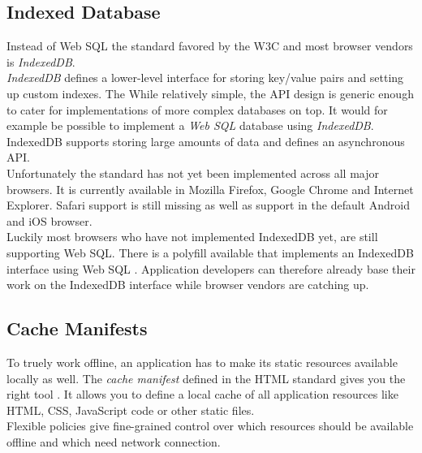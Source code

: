 \subsection{Indexed Database}
Instead of Web SQL the standard favored by the W3C and most browser vendors is \emph{IndexedDB}.\\
\emph{IndexedDB} defines a lower-level interface for storing key/value pairs and setting up custom indexes.
The While relatively simple, the API design is generic enough to cater for implementations of more complex databases on top.
It would for example be possible to implement a \emph{Web SQL} database using \emph{IndexedDB}.\\
IndexedDB supports storing large amounts of data and defines an asynchronous API.\\
Unfortunately the standard has not yet been implemented across all major browsers.
It is currently available in Mozilla Firefox, Google Chrome and Internet Explorer.
Safari support is still missing as well as support in the default Android and iOS browser.\\
Luckily most browsers who have not implemented IndexedDB yet, are still supporting Web SQL.
There is a polyfill available that implements an IndexedDB interface using Web SQL \cite{indexeddb_polyfill}. Application developers can therefore already base their work on the IndexedDB interface while browser vendors are catching up.

\subsection{Cache Manifests}
To truely work offline, an application has to make its static resources available locally as well.
The \emph{cache manifest} defined in the HTML standard gives you the right tool \cite{cache_manifests}. It allows you to define a local cache of all application resources like HTML, CSS, JavaScript code or other static files.\\
Flexible policies give fine-grained control over which resources should be available offline and which need network connection.
